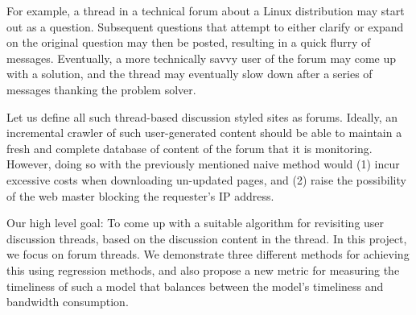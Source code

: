 For example, a thread in a technical forum about a Linux distribution may start 
out as a question. Subsequent questions that attempt to either clarify or expand 
on the original question may then be posted, resulting in a quick flurry of 
messages. Eventually, a more technically savvy user of the forum may come up 
with a solution, and the thread may eventually slow down after a series of 
messages thanking the problem solver. 

Let us define all such thread-based discussion styled sites as forums. Ideally, 
an incremental crawler of such user-generated content should be able to maintain 
a fresh and complete database of content of the forum that it is monitoring.  
However, doing so with the previously mentioned naive method would (1) incur 
excessive costs when downloading un-updated pages, and (2) raise the possibility 
of the web master blocking the requester's IP address.

Our high level goal: To come up with a suitable algorithm for revisiting user 
discussion threads, based on the discussion content in the thread. In this 
project, we focus on forum threads. We demonstrate three different methods for 
achieving this using regression methods, and also propose a new metric for 
measuring the timeliness of such a model that balances between the model's 
timeliness and bandwidth consumption.

